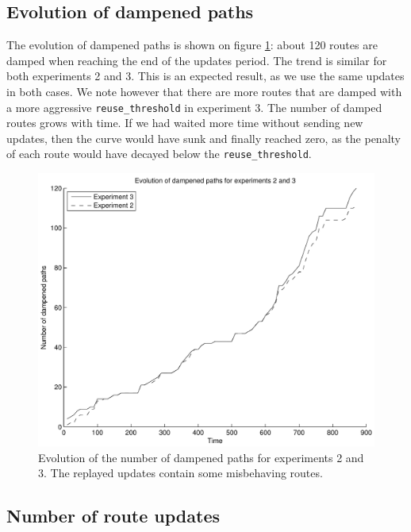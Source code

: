 \documentclass[a4paper,english]{IEEEtran}
\begin{document}
\subsection{Evolution of dampened paths}

The evolution of dampened paths is shown on figure \ref{fig_dampenedpaths}: about 120 routes
are damped when reaching the end of the updates period.
The trend is similar for both experiments 2 and 3. This is an expected result, as we use the 
same updates in both cases. We note however that there are more routes that are damped with 
a more aggressive \texttt{\small reuse\_threshold} in experiment 3.
The number of damped routes grows with time. If we had waited more time without sending new 
updates, then the curve would have sunk and finally reached zero, as the penalty 
of each route would have decayed below the \texttt{\small reuse\_threshold}.

\begin{figure}
\begin{center}
\includegraphics[scale=.5]{img/dampened_paths.pdf}
\end{center}
\caption{Evolution of the number of dampened paths for experiments 2 and 3.
The replayed updates contain some misbehaving routes.}
\label{fig_dampenedpaths}
\end{figure}

\subsection{Number of route updates}
\end{document}
